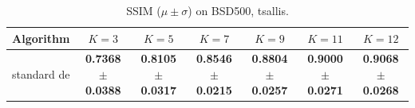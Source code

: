 \begin{table}[htbp]
\centering
\caption{SSIM ($\mu \pm \sigma$) on BSD500, tsallis.}
\label{tab:exp1-tsallis-ssim}
\begin{tabular}{lcccccc}
\toprule
Algorithm & $K=3$ & $K=5$ & $K=7$ & $K=9$ & $K=11$ & $K=12$ \\
\midrule
standard de & \textbf{0.7368 $\pm$ 0.0388} & \textbf{0.8105 $\pm$ 0.0317} & \textbf{0.8546 $\pm$ 0.0215} & \textbf{0.8804 $\pm$ 0.0257} & \textbf{0.9000 $\pm$ 0.0271} & \textbf{0.9068 $\pm$ 0.0268} \\
\bottomrule
\end{tabular}
\end{table}